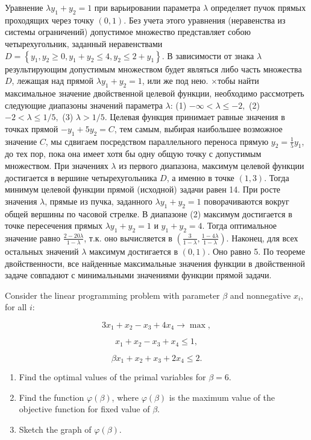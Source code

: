 \begin{solution}
Уравнение $\lambda y_{1} +y_{2} =1$ при варьировании параметра $\lambda $ определяет пучок прямых проходящих через точку $(0,1)$. Без учета этого уравнения (неравенства из системы ограничений) допустимое множество представляет собою четырехугольник, заданный неравенствами $D=\left\{y_{1} ,y_{2} \ge 0,y_{1} +y_{2} \le 4,y_{2} \le 2+y_{1} \right\}$. В зависимости от знака $\lambda $ результирующим допустимым множеством будет являться либо часть множества $D$, лежащая над прямой $\lambda y_{1} +y_{2} =1$, или же под нею. $\times$тобы найти максимальное значение двойственной целевой функции, необходимо рассмотреть следующие диапазоны значений параметра $\lambda $: (1) $-\infty <\lambda \le -2,$ (2) $-2<\lambda \le 1/5,$ (3) $\lambda >1/5.$ Целевая функция принимает равные значения в точках прямой $-y_{1} +5y_{2} =C$, тем самым, выбирая наибольшее возможное значение $C$, мы сдвигаем посредством параллельного переноса прямую $y_{2} =\frac{1}{5} y_{1} $, до тех пор, пока она имеет хотя бы одну общую точку с допустимым множеством. При значениях $\lambda $ из первого диапазона, максимум целевой функции достигается в вершине четырехугольника $D$, а именно в точке $(1,3)$. Тогда минимум целевой функции прямой (исходной) задачи равен 14. При росте значения $\lambda $, прямые из пучка, заданного $\lambda y_{1} +y_{2} =1$ поворачиваются вокруг общей вершины по часовой стрелке. В диапазоне (2) максимум достигается в точке пересечения прямых $\lambda y_{1} +y_{2} =1$ и $y_{1} +y_{2} =4$. Тогда оптимальное значение  равно $\frac{2-20\lambda }{1-\lambda } $, т.к. оно вычисляется в $(\frac{3}{1-\lambda } ,  \frac{1-4\lambda }{1-\lambda } )$. Наконец, для всех остальных значений $\lambda $ максимум достигается в $(0,1).$ Оно равно 5. По теореме двойственности, все найденные максимальные значения функции в двойственной задаче совпадают с минимальными значениями функции прямой задачи.
\end{solution}

\begin{problem}
Consider the linear programming problem with parameter $\beta $ and nonnegative $x_{i} $, for all $i$:

\[3x_{1} +x_{2} -x_{3} +4x_{4} \to \max ,\] 

\[x_{1} +x_{2} -x_{3} +x_{4} \le 1,\] 

\[\beta x_{1} +x_{2} +x_{3} +2x_{4} \le 2.\] 

\begin{enumerate}
\item  Find the optimal values of the primal variables for $\beta =6$.

\item  Find the function $\varphi (\beta )$, where $\varphi (\beta )$ is the maximum value of the objective function for fixed value of $\beta $.

\item  Sketch the graph of $\varphi (\beta )$.
\end{enumerate}
\end{problem}


